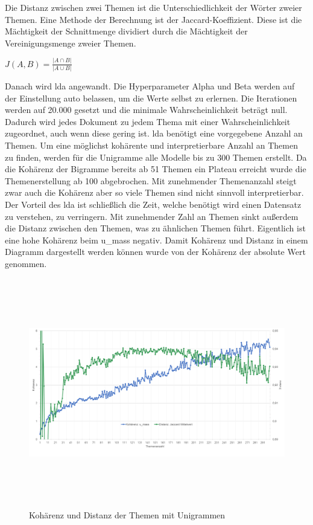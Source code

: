 Die Distanz zwischen zwei Themen ist die Unterschiedlichkeit der Wörter zweier Themen. Eine Methode der Berechnung ist der Jaccard-Koeffizient. Diese ist die Mächtigkeit der Schnittmenge dividiert durch die Mächtigkeit der Vereinigungsmenge zweier Themen.


\begin{center}
	$J(A,B) = \frac{\left|A \cap B\right|}{\left|A \cup B\right|}$ 
\end{center}


Danach wird \ac{lda} angewandt. Die Hyperparameter Alpha und Beta werden auf der Einstellung auto belassen, um die Werte selbst zu erlernen. Die Iterationen werden auf 20.000 gesetzt und die minimale Wahrscheinlichkeit beträgt null. Dadurch wird jedes Dokument zu jedem Thema mit einer Wahrscheinlichkeit zugeordnet, auch wenn diese gering ist. \ac{lda} benötigt eine vorgegebene Anzahl an Themen. Um eine möglichst kohärente und interpretierbare Anzahl an Themen zu finden, werden für die Unigramme alle Modelle bis zu 300 Themen erstellt. Da die Kohärenz der Bigramme bereits ab 51 Themen ein Plateau erreicht wurde die Themenerstellung ab 100 abgebrochen. Mit zunehmender Themenanzahl steigt zwar auch die Kohärenz aber so viele Themen sind nicht sinnvoll interpretierbar. Der Vorteil des \ac{lda} ist schließlich die Zeit, welche benötigt wird einen Datensatz zu verstehen, zu verringern. Mit zunehmender Zahl an Themen sinkt außerdem die Distanz zwischen den Themen, was zu ähnlichen Themen führt. Eigentlich ist eine hohe Kohärenz beim u\_mass negativ. Damit Kohärenz und Distanz in einem Diagramm dargestellt werden können wurde von der Kohärenz der absolute Wert genommen.


\begin{figure}[htpb]
	\centering
	\includegraphics[width=\textwidth,height=10cm,keepaspectratio=true]{img/coherenceAndDistanceUnigram.png}
	\caption{
		Kohärenz und Distanz der Themen mit Unigrammen
	}
	\label{fig:Kohärenz_Distanz_Unigramme}
\end{figure}

